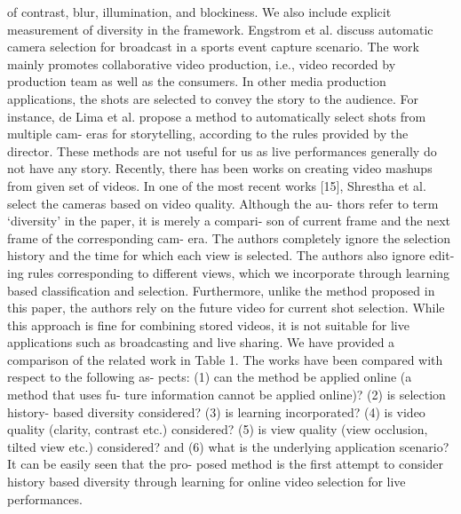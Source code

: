 \documentclass{sig-alternate}
\begin{document}
of contrast, blur, illumination, and blockiness. We also include
explicit measurement of diversity in the framework. Engstrom et
al. \cite{salas:eight} discuss automatic camera selection for broadcast in a sports
event capture scenario. The work mainly promotes collaborative
video production, i.e., video recorded by production team as well
as the consumers.
In other media production applications, the shots are selected to
convey the story to the audience. For instance, de Lima et al. \cite{salas:seven}
propose a method to automatically select shots from multiple cam-
eras for storytelling, according to the rules provided by the director.
These methods are not useful for us as live performances generally
do not have any story.
Recently, there has been works on creating video mashups from
given set of videos. In one of the most recent works [15], Shrestha
et al. select the cameras based on video quality. Although the au-
thors refer to term ‘diversity’ in the paper, it is merely a compari-
son of current frame and the next frame of the corresponding cam-
era. The authors completely ignore the selection history and the
time for which each view is selected. The authors also ignore edit-
ing rules corresponding to different views, which we incorporate
through learning based classification and selection. Furthermore,
unlike the method proposed in this paper, the authors rely on the
future video for current shot selection. While this approach is fine
for combining stored videos, it is not suitable for live applications
such as broadcasting and live sharing.
We have provided a comparison of the related work in Table 1.
The works have been compared with respect to the following as-
pects: (1) can the method be applied online (a method that uses fu-
ture information cannot be applied online)? (2) is selection history-
based diversity considered? (3) is learning incorporated? (4) is
video quality (clarity, contrast etc.) considered? (5) is view quality
(view occlusion, tilted view etc.) considered? and (6) what is the
underlying application scenario? It can be easily seen that the pro-
posed method is the first attempt to consider history based diversity
through learning for online video selection for live performances.
\end{document}
